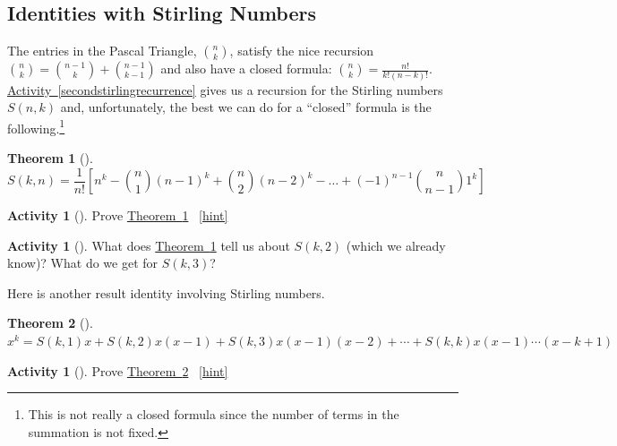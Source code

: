\documentclass[10pt,]{book}
\theoremstyle{plain}
\newtheorem{theorem}{Theorem}[section]
\theoremstyle{definition}
\theoremstyle{definition}
\theoremstyle{definition}
\newtheorem{activity}[project]{Activity}
\numberwithin{equation}{chapter}
\begin{document}
\subsection[{Identities with Stirling Numbers}]{Identities with Stirling Numbers}\label{subsec-stirlingidentities}
\hypertarget{p-1030}{}%
The entries in the Pascal Triangle, \(\binom{n}{k}\), satisfy the nice recursion \(\binom{n}{k} = \binom{n - 1}{k} + \binom{n - 1}{k - 1}\) and also have a closed formula: \(\binom{n}{k} = \frac{n!}{k!(n - k)!}\). \hyperref[secondstirlingrecurrence]{Activity~\ref{secondstirlingrecurrence}} gives us a recursion for the Stirling numbers \(S(n,k)\) and, unfortunately, the best we can do for a ``closed'' formula is the following.\footnote{This is not really a closed formula since the number of terms in the summation is not fixed.\label{fn-11}}%
\begin{theorem}[{}]\label{thm-stirling-closed}
\hypertarget{p-1031}{}%
%
\begin{equation*}
S(k,n) = \frac{1}{n!}\left[n^{k} - \binom{n}{1} \left( n - 1 \right)^{k} + \binom{n}{2} \left( n - 2 \right)^{k} - \ldots + \left( - 1 \right)^{n - 1}\binom{n}{n - 1} 1^{k} \right] 
\end{equation*}
%
\end{theorem}
\begin{activity}[]\label{activity-223}
\hypertarget{p-1032}{}%
Prove \hyperref[thm-stirling-closed]{Theorem~\ref{thm-stirling-closed}}%
~\hfill{\tiny\hyperlink{a-223}{[hint]}\hypertarget{q-223}{}}\end{activity}
\begin{activity}[]\label{activity-224}
\hypertarget{p-1036}{}%
What does \hyperref[thm-stirling-closed]{Theorem~\ref{thm-stirling-closed}} tell us about \(S(k, 2)\) (which we already know)?  What do we get for \(S(k,3)\)?%
\end{activity}
\hypertarget{p-1039}{}%
Here is another result identity involving Stirling numbers.%
\begin{theorem}[{}]\label{thm-stirling-polynomial}
\hypertarget{p-1040}{}%
\(x^{k} = S\left(k,1 \right)x + S\left(k,2 \right)x\left( x - 1 \right) + S\left(k,3 \right)x\left( x - 1 \right)\left( x - 2 \right) + \cdots
+ S\left(k,k \right)x\left( x - 1 \right)\cdots(x -k + 1)\)%
\end{theorem}
\begin{activity}[]\label{activity-225}
\hypertarget{p-1041}{}%
Prove \hyperref[thm-stirling-polynomial]{Theorem~\ref{thm-stirling-polynomial}}%
~\hfill{\tiny\hyperlink{a-225}{[hint]}\hypertarget{q-225}{}}\end{activity}
\end{document}
